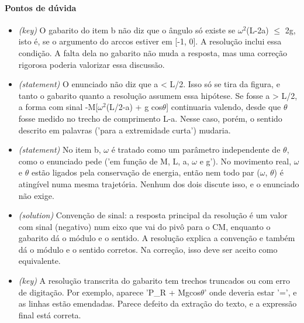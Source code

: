 \documentclass{article}%
\begin{document}
\paragraph{Pontos de dúvida}%
\begin{itemize}%
\item%
\textit{(key)} O gabarito do item b não diz que o ângulo só existe se $\omega$$^2$(L-2a) $\leq$ 2g, isto é, se o argumento do arccos estiver em {[}-1, 0{]}. A resolução inclui essa condição. A falta dela no gabarito não muda a resposta, mas uma correção rigorosa poderia valorizar essa discussão.%
\item%
\textit{(statement)} O enunciado não diz que a < L/2. Isso só se tira da figura, e tanto o gabarito quanto a resolução assumem essa hipótese. Se fosse a > L/2, a forma com sinal -M{[}$\omega$$^2$(L/2-a) + g cos$\theta${]} continuaria valendo, desde que $\theta$ fosse medido no trecho de comprimento L-a. Nesse caso, porém, o sentido descrito em palavras ('para a extremidade curta') mudaria.%
\item%
\textit{(statement)} No item b, $\omega$ é tratado como um parâmetro independente de $\theta$, como o enunciado pede ('em função de M, L, a, $\omega$ e g'). No movimento real, $\omega$ e $\theta$ estão ligados pela conservação de energia, então nem todo par ($\omega$, $\theta$) é atingível numa mesma trajetória. Nenhum dos dois discute isso, e o enunciado não exige.%
\item%
\textit{(solution)} Convenção de sinal: a resposta principal da resolução é um valor com sinal (negativo) num eixo que vai do pivô para o CM, enquanto o gabarito dá o módulo e o sentido. A resolução explica a convenção e também dá o módulo e o sentido corretos. Na correção, isso deve ser aceito como equivalente.%
\item%
\textit{(key)} A resolução transcrita do gabarito tem trechos truncados ou com erro de digitação. Por exemplo, aparece 'P\_R + Mgcos$\theta$' onde deveria estar '=', e as linhas estão emendadas. Parece defeito da extração do texto, e a expressão final está correta.%
\end{itemize}%
\end{document}
